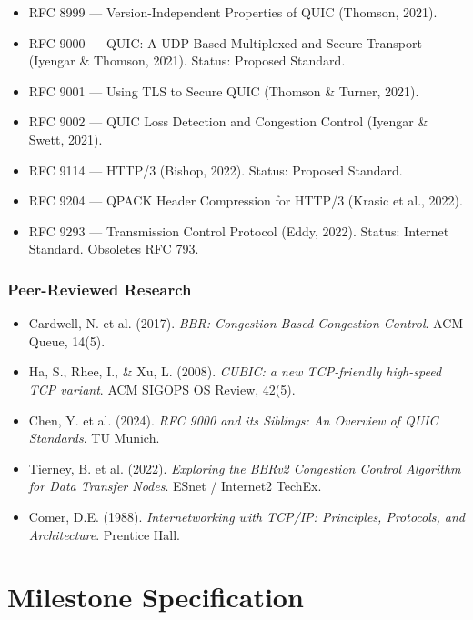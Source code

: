 \documentclass[11pt,letterpaper]{article}
\newcommand{\stageheader}[2]{%
  \noindent\colorbox{#2}{\makebox[\textwidth][l]{%
    \textcolor{white}{\bfseries\sffamily\hspace{6pt}#1\hspace{6pt}}}}%
  \vspace{0.5em}\par%
}
\begin{document}
\begin{itemize}[noitemsep]
  \item RFC 8999 --- Version-Independent Properties of QUIC (Thomson, 2021).
  \item RFC 9000 --- QUIC: A UDP-Based Multiplexed and Secure Transport (Iyengar \& Thomson, 2021). Status: Proposed Standard.
  \item RFC 9001 --- Using TLS to Secure QUIC (Thomson \& Turner, 2021).
  \item RFC 9002 --- QUIC Loss Detection and Congestion Control (Iyengar \& Swett, 2021).
  \item RFC 9114 --- HTTP/3 (Bishop, 2022). Status: Proposed Standard.
  \item RFC 9204 --- QPACK Header Compression for HTTP/3 (Krasic et al., 2022).
  \item RFC 9293 --- Transmission Control Protocol (Eddy, 2022). Status: Internet Standard. Obsoletes RFC 793.
\end{itemize}

\subsubsection{Peer-Reviewed Research}

\begin{itemize}[noitemsep]
  \item Cardwell, N. et al. (2017). \textit{BBR: Congestion-Based Congestion Control}. ACM Queue, 14(5).
  \item Ha, S., Rhee, I., \& Xu, L. (2008). \textit{CUBIC: a new TCP-friendly high-speed TCP variant}. ACM SIGOPS OS Review, 42(5).
  \item Chen, Y. et al. (2024). \textit{RFC 9000 and its Siblings: An Overview of QUIC Standards}. TU Munich.
  \item Tierney, B. et al. (2022). \textit{Exploring the BBRv2 Congestion Control Algorithm for Data Transfer Nodes}. ESnet / Internet2 TechEx.
  \item Comer, D.E. (1988). \textit{Internetworking with TCP/IP: Principles, Protocols, and Architecture}. Prentice Hall.
\end{itemize}

\newpage

\stageheader{STAGE 3 --- MISSION PACKAGE}{tertiary}

\section{Milestone Specification}
\end{document}
